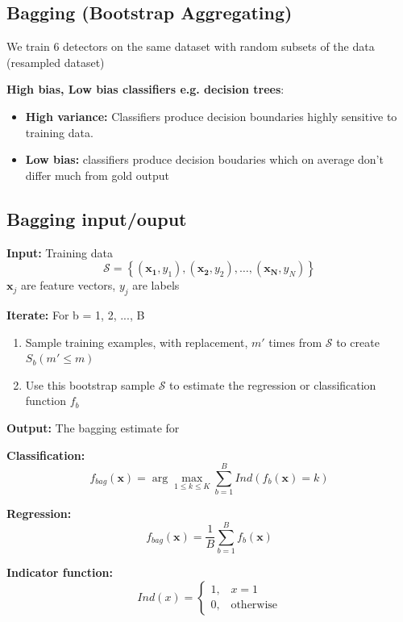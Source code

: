 \documentclass[12pt,a4paper]{article}
\begin{document}
\subsection{Bagging (Bootstrap Aggregating)}
We train 6 detectors on the same dataset with random subsets of the data (resampled dataset)

\textbf{High bias, Low bias classifiers e.g. decision trees}:
\begin{itemize}
    \item \textbf{High variance:} Classifiers produce decision boundaries highly sensitive to training data. 
    \item \textbf{Low bias:} classifiers produce decision boudaries which on average don't differ much from gold output
\end{itemize}

\subsection{Bagging input/ouput}
\textbf{Input:} Training data
\[
\mathcal{S} = \left\{(\mathbf{x_1}, y_1), (\mathbf{x_2}, y_2), \ldots, (\mathbf{x_N}, y_N)\right\}
\]
$\mathbf{x}_j$ are feature vectors, $y_j$ are labels
\vspace{10pt}

\textbf{Iterate:} For b = 1, 2, ..., B
\begin{enumerate}
    \item Sample training examples, with replacement, $m'$ times from $\mathcal{S}$ to create $S_b(m' \leq m)$
    \item Use this bootstrap sample $\mathcal{S}$ to estimate the regression or classification function $f_b$
\end{enumerate}

\textbf{Output:} The bagging estimate for
\vspace{10pt}

\textbf{Classification:}
\[
f_{bag}(\mathbf{x}) = \arg \max_{1 \leq k \leq K} \sum_{b=1}^{B} Ind(f_b(\mathbf{x}) = k)
\]

\textbf{Regression:}
\[
f_{bag}(\mathbf{x}) = \frac{1}{B} \sum_{b=1}^{B} f_b(\mathbf{x})
\]

\textbf{Indicator function:}
\[
Ind(x) = \begin{cases}
    1, \hspace{10pt} x = 1 \\
    0, \hspace{10pt} \text{otherwise}
\end{cases}
\]
\end{document}
